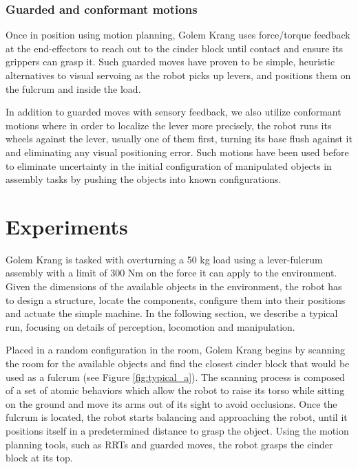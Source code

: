 \documentclass[runningheads,a4paper]{llncs}
\begin{document}
\subsubsection{Guarded and conformant motions}

Once in position using motion planning, Golem Krang uses force/torque feedback at the end-effectors
to reach out to the cinder block until contact and ensure its grippers can grasp it. Such guarded
moves have proven to be simple, heuristic alternatives to visual servoing as the robot picks up
levers, and positions them on the fulcrum and inside the load.

In addition to guarded moves with sensory feedback, we also utilize conformant motions where
in order to localize the lever more precisely, the robot runs its wheels against the lever,
usually one of them first, turning its base flush against it and eliminating any visual positioning error.
Such motions have been used before to eliminate uncertainty in the initial configuration of manipulated
objects in assembly tasks by pushing the objects into known configurations. \cite{mason1986mechanics}

\section{Experiments}

Golem Krang is tasked with overturning a 50 kg load using a lever-fulcrum assembly with a limit of
300 Nm on the force it can apply to the environment. Given the dimensions of the 
available objects in the environment, the robot has to design a structure, locate the components,
configure them into their positions and actuate the simple machine. In the following section, we
describe a typical run, focusing on details of perception, locomotion and manipulation.

Placed in a random configuration in the room, Golem Krang begins by scanning the room for the 
available objects and find the closest cinder block that would be used as a fulcrum (see Figure \ref{fig:typical_a}).
The scanning process is composed of a set of atomic behaviors which allow the robot to raise
its torso while sitting on the ground and move its arms out of its sight to avoid occlusions.
Once the fulcrum is located, the robot starts balancing and approaching the robot, until it 
positions itself in a predetermined distance to grasp the object. Using the motion planning tools,
such as RRTs and guarded moves, the robot grasps the cinder block at its top.
\end{document}
